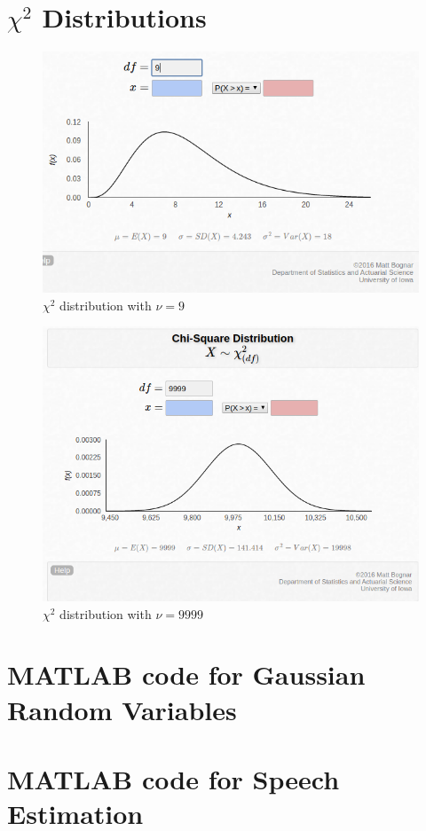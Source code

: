 \documentclass[a4paper, 12pt]{article}
\begin{document}
    \begin{appendices}
        \section{$\chi^2$ Distributions}
        \label{app:chiDists}
            \begin{figure}[!ht]
                \centering
                \includegraphics[width=\textwidth]{nu9.png}
                \caption{$\chi^2$ distribution with $\nu=9$}
            \end{figure}
            \begin{figure}[!ht]
                \centering
                \includegraphics[width=\textwidth]{nu9999.png}
                \caption{$\chi^2$ distribution with $\nu=9999$}
            \end{figure}
        \section{MATLAB code for Gaussian Random Variables}
            
        \section{MATLAB code for Speech Estimation}
            
    \end{appendices}
\end{document}
